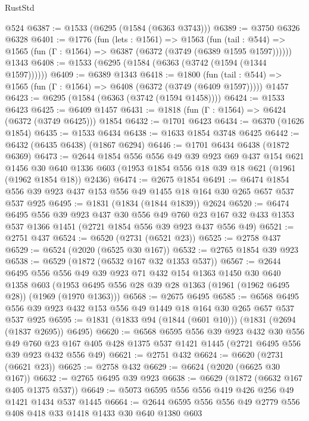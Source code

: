\begin{lexlean}{RustStd}
\begin{coremodule}
    @524
@6387 := @1533 (@6295 (@1584 (@6363 @3743)))
@6389 := @3750 @6326 @6328
@6401 := @1776
    (fun (lets : @1561) =>
    @1563
      (fun (tail : @544) => @1565 (fun (Γ : @1564) => @6387 (@6372 (@3749 (@6389 @1595 @1597))))))
    @1343
@6408 := @1533 (@6295 (@1584 (@6363 (@3742 (@1594 (@1344 @1597))))))
@6409 := @6389 @1343
@6418 := @1800
    (fun (tail : @544) => @1565 (fun (Γ : @1564) => @6408 (@6372 (@3749 (@6409 @1597)))))
    @1457
@6423 := @6295 (@1584 (@6363 (@3742 (@1594 @1458))))
@6424 := @1533 @6423
@6425 := @6409 @1457
@6431 := @1818 (fun (Γ : @1564) => @6424 (@6372 (@3749 @6425))) @1854
@6432 := @1701 @6423
@6434 := @6370 (@1626 @1854)
@6435 := @1533 @6434
@6438 := @1633 @1854 @3748 @6425
@6442 := @6432 (@6435 @6438) (@1867 @6294)
@6446 := @1701 @6434 @6438 (@1872 @6369)
@6473 := @2644
    @1854
    @556
    @556
    @49
    @39
    @923
    @69
    @437
    @154
    @621
    @1456
    @30
    @640
    @1336
    @603
    (@1953 @1854 @556 @18 @39 @18 @621 (@1961 (@1962 @1854 @18)) @2436)
@6474 := @2675 @1854
@6491 := @6474 @1854 @556 @39 @923 @437 @153 @556 @49 @1455 @18 @164 @30 @265 @657 @537 @537 @925
@6495 := @1831 (@1834 (@1844 @1839)) @2624
@6520 := @6474
    @6495
    @556
    @39
    @923
    @437
    @30
    @556
    @49
    @760
    @23
    @167
    @32
    @433
    @1353
    @537
    @1366
    @1451
    (@2721 @1854 @556 @39 @923 @437 @556 @49)
@6521 := @2751 @437
@6524 := @6520 (@2731 (@6521 @23))
@6525 := @2758 @437
@6529 := @6524 (@2020 (@6525 @30 @167))
@6532 := @2765 @1854 @39 @923
@6538 := @6529 (@1872 (@6532 @167 @32 @1353 @537))
@6567 := @2644
    @6495
    @556
    @556
    @49
    @39
    @923
    @71
    @432
    @154
    @1363
    @1450
    @30
    @640
    @1358
    @603
    (@1953 @6495 @556 @28 @39 @28 @1363 (@1961 (@1962 @6495 @28)) (@1969 (@1970 @1363)))
@6568 := @2675 @6495
@6585 := @6568 @6495 @556 @39 @923 @432 @153 @556 @49 @1449 @18 @164 @30 @265 @657 @537 @537 @925
@6595 := @1831 (@1833 @94 (@1844 (@601 @10))) (@1831 (@2694 (@1837 @2695)) @6495)
@6620 := @6568
    @6595
    @556
    @39
    @923
    @432
    @30
    @556
    @49
    @760
    @23
    @167
    @405
    @428
    @1375
    @537
    @1421
    @1445
    (@2721 @6495 @556 @39 @923 @432 @556 @49)
@6621 := @2751 @432
@6624 := @6620 (@2731 (@6621 @23))
@6625 := @2758 @432
@6629 := @6624 (@2020 (@6625 @30 @167))
@6632 := @2765 @6495 @39 @923
@6638 := @6629 (@1872 (@6632 @167 @405 @1375 @537))
@6649 := @5073 @6595 @556 @556 @419 @426 @256 @49 @1421 @1434 @537 @1445
@6664 := @2644 @6595 @556 @556 @49 @2779 @556 @408 @418 @33 @1418 @1433 @30 @640 @1380 @603

\end{coremodule}
\end{lexlean}
